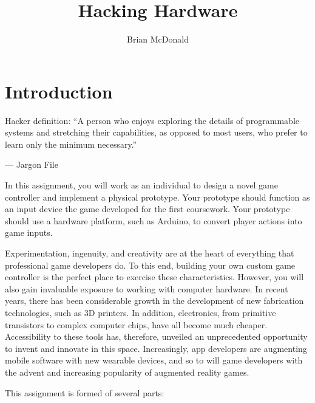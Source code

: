 \documentclass{../fal_assignment}
\title{Hacking Hardware}
\author{Brian McDonald}
\begin{document}
\maketitle

\section*{Introduction}

\begin{marginquote}
Hacker definition: ``A person who enjoys exploring the details of programmable systems and stretching their capabilities, as opposed to most users, who prefer to learn only the minimum necessary.''

--- Jargon File

\end{marginquote}

In this assignment, you will work as an individual to design a novel game controller and implement a physical prototype. Your prototype should function as an input device the game developed for the first coursework. Your prototype should use a hardware platform, such as Arduino, to convert player actions into game inputs. 

Experimentation, ingenuity, and creativity are at the heart of everything that professional game developers do. To this end, building your own custom game controller is the perfect place to exercise these characteristics. However, you will also gain invaluable exposure to working with computer hardware. In recent years, there has been considerable growth in the development of new fabrication technologies, such as 3D printers. In addition, electronics, from primitive transistors to complex computer chips, have all become much cheaper. Accessibility to these tools has, therefore, unveiled an unprecedented opportunity to invent and innovate in this space. Increasingly, app developers are augmenting mobile software with new wearable devices, and so to will game developers with the advent and increasing popularity of augmented reality games.

This assignment is formed of several parts:
\end{document}
